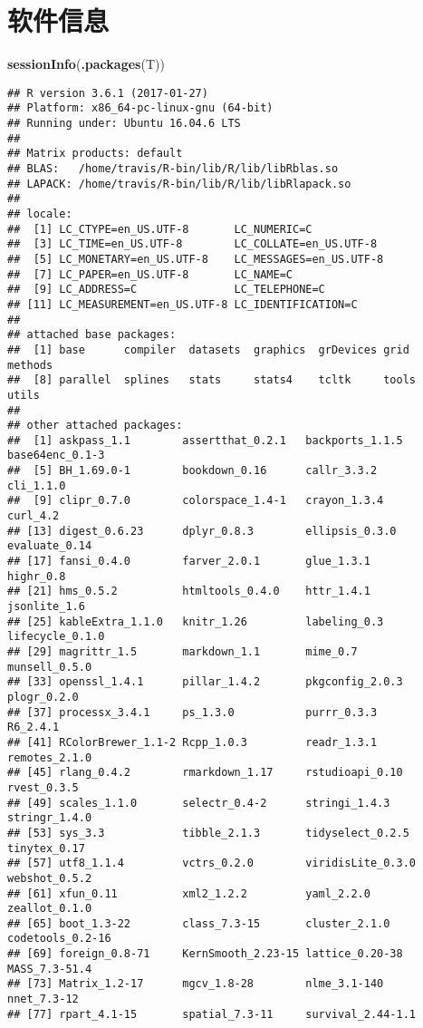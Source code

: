 \documentclass[]{book}
\newenvironment{Shaded}{\begin{snugshade}}{\end{snugshade}}
\newcommand{\KeywordTok}[1]{\textcolor[rgb]{0.13,0.29,0.53}{\textbf{#1}}}
\newcommand{\NormalTok}[1]{#1}
\begin{document}
\hypertarget{session-info}{%
\section{软件信息}\label{session-info}}

\begin{Shaded}
\begin{Highlighting}[]
\KeywordTok{sessionInfo}\NormalTok{(}\KeywordTok{.packages}\NormalTok{(T))}
\end{Highlighting}
\end{Shaded}

\begin{verbatim}
## R version 3.6.1 (2017-01-27)
## Platform: x86_64-pc-linux-gnu (64-bit)
## Running under: Ubuntu 16.04.6 LTS
## 
## Matrix products: default
## BLAS:   /home/travis/R-bin/lib/R/lib/libRblas.so
## LAPACK: /home/travis/R-bin/lib/R/lib/libRlapack.so
## 
## locale:
##  [1] LC_CTYPE=en_US.UTF-8       LC_NUMERIC=C              
##  [3] LC_TIME=en_US.UTF-8        LC_COLLATE=en_US.UTF-8    
##  [5] LC_MONETARY=en_US.UTF-8    LC_MESSAGES=en_US.UTF-8   
##  [7] LC_PAPER=en_US.UTF-8       LC_NAME=C                 
##  [9] LC_ADDRESS=C               LC_TELEPHONE=C            
## [11] LC_MEASUREMENT=en_US.UTF-8 LC_IDENTIFICATION=C       
## 
## attached base packages:
##  [1] base      compiler  datasets  graphics  grDevices grid      methods  
##  [8] parallel  splines   stats     stats4    tcltk     tools     utils    
## 
## other attached packages:
##  [1] askpass_1.1        assertthat_0.2.1   backports_1.1.5    base64enc_0.1-3   
##  [5] BH_1.69.0-1        bookdown_0.16      callr_3.3.2        cli_1.1.0         
##  [9] clipr_0.7.0        colorspace_1.4-1   crayon_1.3.4       curl_4.2          
## [13] digest_0.6.23      dplyr_0.8.3        ellipsis_0.3.0     evaluate_0.14     
## [17] fansi_0.4.0        farver_2.0.1       glue_1.3.1         highr_0.8         
## [21] hms_0.5.2          htmltools_0.4.0    httr_1.4.1         jsonlite_1.6      
## [25] kableExtra_1.1.0   knitr_1.26         labeling_0.3       lifecycle_0.1.0   
## [29] magrittr_1.5       markdown_1.1       mime_0.7           munsell_0.5.0     
## [33] openssl_1.4.1      pillar_1.4.2       pkgconfig_2.0.3    plogr_0.2.0       
## [37] processx_3.4.1     ps_1.3.0           purrr_0.3.3        R6_2.4.1          
## [41] RColorBrewer_1.1-2 Rcpp_1.0.3         readr_1.3.1        remotes_2.1.0     
## [45] rlang_0.4.2        rmarkdown_1.17     rstudioapi_0.10    rvest_0.3.5       
## [49] scales_1.1.0       selectr_0.4-2      stringi_1.4.3      stringr_1.4.0     
## [53] sys_3.3            tibble_2.1.3       tidyselect_0.2.5   tinytex_0.17      
## [57] utf8_1.1.4         vctrs_0.2.0        viridisLite_0.3.0  webshot_0.5.2     
## [61] xfun_0.11          xml2_1.2.2         yaml_2.2.0         zeallot_0.1.0     
## [65] boot_1.3-22        class_7.3-15       cluster_2.1.0      codetools_0.2-16  
## [69] foreign_0.8-71     KernSmooth_2.23-15 lattice_0.20-38    MASS_7.3-51.4     
## [73] Matrix_1.2-17      mgcv_1.8-28        nlme_3.1-140       nnet_7.3-12       
## [77] rpart_4.1-15       spatial_7.3-11     survival_2.44-1.1
\end{verbatim}


\end{document}
